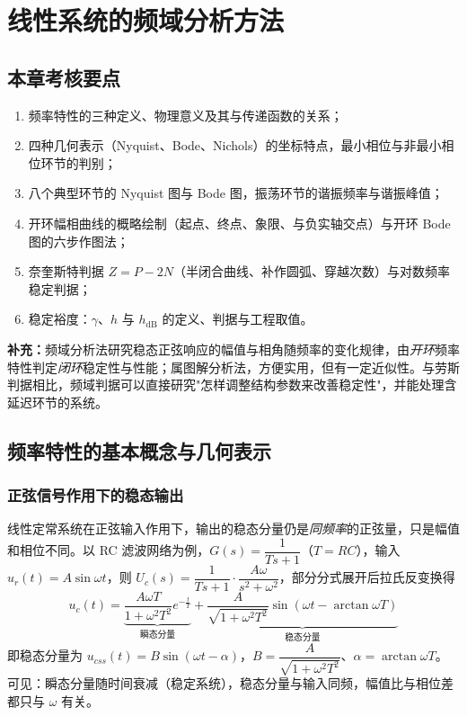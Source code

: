 \chapter{线性系统的频域分析方法}

\setlength{\parskip}{0.8ex plus 0.3ex minus 0.2ex}
\renewcommand{\arraystretch}{1.5}
\setlength{\tabcolsep}{10pt}
\addtolength{\abovedisplayskip}{2pt}
\addtolength{\belowdisplayskip}{2pt}

\bigskip

\section{本章考核要点}
\begin{enumerate}
    \item 频率特性的三种定义、物理意义及其与传递函数的关系；
    \item 四种几何表示（Nyquist、Bode、Nichols）的坐标特点，最小相位与非最小相位环节的判别；
    \item 八个典型环节的 Nyquist 图与 Bode 图，振荡环节的谐振频率与谐振峰值；
    \item 开环幅相曲线的概略绘制（起点、终点、象限、与负实轴交点）与开环 Bode 图的六步作图法；
    \item 奈奎斯特判据 $Z=P-2N$（半闭合曲线、补作圆弧、穿越次数）与对数频率稳定判据；
    \item 稳定裕度：$\gamma$、$h$ 与 $h_{\mathrm{dB}}$ 的定义、判据与工程取值。
\end{enumerate}
\noindent\textbf{补充：}频域分析法研究稳态正弦响应的幅值与相角随频率的变化规律，由\emph{开环}频率特性判定\emph{闭环}稳定性与性能；属图解分析法，方便实用，但有一定近似性。与劳斯判据相比，频域判据可以直接研究"怎样调整结构参数来改善稳定性"，并能处理含延迟环节的系统。

\medskip

\section{频率特性的基本概念与几何表示}

\subsection{正弦信号作用下的稳态输出}
线性定常系统在正弦输入作用下，输出的稳态分量仍是\emph{同频率}的正弦量，只是幅值和相位不同。以 RC 滤波网络为例，$G(s)=\dfrac{1}{Ts+1}$（$T=RC$），输入 $u_r(t)=A\sin\omega t$，则 $U_c(s)=\dfrac{1}{Ts+1}\cdot\dfrac{A\omega}{s^2+\omega^2}$，部分分式展开后拉氏反变换得
\[
u_c(t)=\underbrace{\frac{A\omega T}{1+\omega^2T^2}e^{-\frac{t}{T}}}_{\text{瞬态分量}}+\underbrace{\frac{A}{\sqrt{1+\omega^2T^2}}\sin(\omega t-\arctan\omega T)}_{\text{稳态分量}}
\]
即稳态分量为 $u_{css}(t)=B\sin(\omega t-\alpha)$，$B=\dfrac{A}{\sqrt{1+\omega^2T^2}}$、$\alpha=\arctan\omega T$。可见：瞬态分量随时间衰减（稳定系统），稳态分量与输入同频，幅值比与相位差都只与 $\omega$ 有关。

